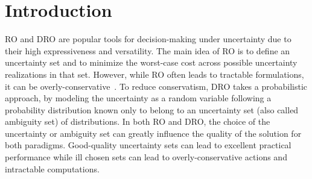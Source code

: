 \documentclass[12pt]{article}
\newcommand{\citep}{\cite}
\theoremstyle{thmstyleone}%
\theoremstyle{thmstyletwo}%
\theoremstyle{thmstylethree}%
\begin{document}

\abstract{%

}%


\maketitle


\fi


\section{Introduction}

\Gls{RO} and \gls{DRO} are popular tools for decision-making under uncertainty due to their high expressiveness and versatility.
The main idea of \gls{RO} is to define an uncertainty set and to minimize the worst-case cost across possible uncertainty realizations in that set.
However, while \gls{RO} often leads to tractable formulations, it can be overly-conservative~\citep{reduce_conserve}.
To reduce conservatism, \gls{DRO} takes a probabilistic approach, by modeling the uncertainty as a random variable following a probability distribution known only to belong to an uncertainty set (also called ambiguity set) of distributions.
%
In both \gls{RO} and \gls{DRO}, the choice of the uncertainty or ambiguity set can greatly influence the quality of the solution for both paradigms.
Good-quality uncertainty sets can lead to excellent practical performance while ill chosen sets can lead to overly-conservative actions and intractable computations.
\end{document}
